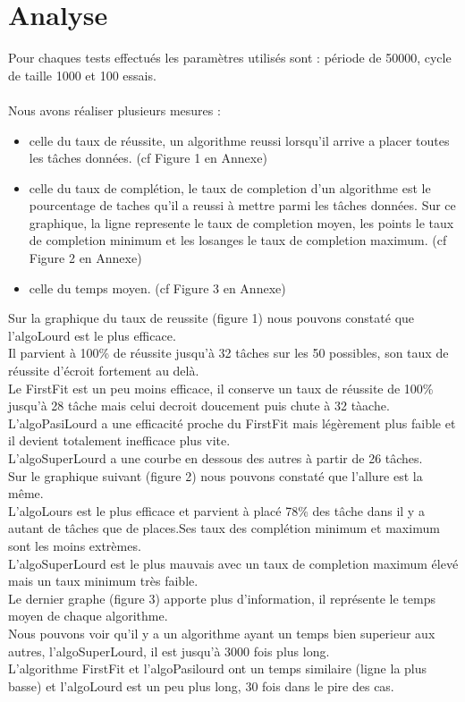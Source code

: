 \documentclass[11pt]{article}
\begin{document}
\section{Analyse}
Pour chaques tests effectués les paramètres utilisés sont : période de 50000, cycle de taille 1000 et 100 essais.\\
\\
Nous avons réaliser plusieurs mesures :
\begin{itemize}
    \item celle du taux de réussite, un algorithme reussi lorsqu'il arrive a placer toutes les tâches données. (cf Figure 1 en Annexe)
    \item celle du taux de complétion, le taux de completion d'un algorithme est le pourcentage de taches qu'il a reussi à mettre parmi les tâches données. Sur ce graphique, la ligne represente le taux de completion moyen, les points le taux de completion minimum et les losanges le taux de completion maximum. (cf Figure 2 en Annexe)
    \item celle du temps moyen. (cf Figure 3 en Annexe)
\end{itemize}
 Sur la graphique du taux de reussite (figure 1) nous pouvons constaté que l'algoLourd est le plus efficace.\\
 Il parvient à 100\% de réussite jusqu'à 32 tâches sur les 50 possibles, son taux de réussite d'écroit fortement au delà.\\
 Le FirstFit est un peu moins efficace, il conserve un taux de réussite de 100\% jusqu'à 28 tâche mais celui decroit doucement puis chute à 32 tàache.\\
 L'algoPasiLourd a une efficacité proche du FirstFit mais légèrement plus faible et il devient totalement inefficace plus vite.\\
 L'algoSuperLourd a une courbe en dessous des autres à partir de 26 tâches.\\

 Sur le graphique suivant (figure 2) nous pouvons constaté que l'allure est la même.\\
 L'algoLours est le plus efficace et parvient à placé 78\% des tâche dans il y a autant de tâches que de places.Ses taux des complétion minimum et maximum sont les moins extrèmes.\\ 
L'algoSuperLourd est le plus mauvais avec un taux de completion maximum élevé mais un taux minimum très faible.\\

Le dernier graphe (figure 3) apporte plus d'information, il représente le temps moyen de chaque algorithme.\\
Nous pouvons voir qu'il y a un algorithme ayant un temps bien superieur aux autres, l'algoSuperLourd, il est jusqu'à 3000 fois plus long.\\
L'algorithme FirstFit et l'algoPasilourd ont un temps similaire (ligne la plus basse) et l'algoLourd est un peu plus long, 30 fois dans le pire des cas.\\
\end{document}
